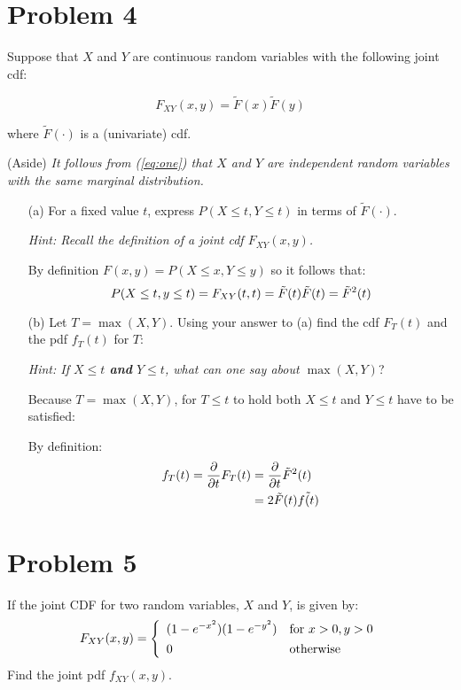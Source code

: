 \documentclass{article}
\newcommand{\1}{\mathbf{1}}
\begin{document}
\newpage
\section*{Problem 4} 
Suppose that $X$ and $Y$ are continuous random variables with the following joint cdf:

\begin{equation}\label{eq:one}
F_{XY}(x,y) = \widetilde{F}(x)\widetilde{F}(y)
\end{equation}

where $\widetilde{F}(\cdot)$ is a (univariate) cdf. 

{{(Aside)} \it It follows from {\rm (\ref{eq:one})} that $X$ and $Y$ are independent random variables with the same
marginal distribution.} 

\begin{itemize}
    \item[(a)] For a fixed value $t$, express $P(X \leq t, Y \leq t)$ in terms of $\widetilde{F}(\cdot)$.\par
    {\it Hint: Recall the definition of  a joint cdf $F_{XY}(x,y)$.}
    
    By definition $F(x,y)= P(X\leq x, Y\leq y)$ so it follows that:
    $$P(X \leq t, y\leq t) = F_{XY}(t,t) = \Tilde{F}(t)\Tilde{F}(t) = \Tilde{F}^2(t)$$
    
    \item[(b)] Let $T= \max (X,Y)$. Using your answer to (a) find the cdf $F_T(t)$ and the pdf $f_T(t)$ for $T$:\par
    {\it Hint: If $X\leq t$ {\bf and} $Y\leq t$, what can one say about $\max(X,Y)$}?
    
    Because $T= \max (X,Y)$, for $T\leq t$ to hold both $X\leq t$ and $Y\leq t$ have to be satisfied:
    
    By definition:
    \begin{align*}
        f_T(t) = \frac{\partial}{\partial t} F_T(t) &=  \frac{\partial}{\partial t} \Tilde{F}^2(t) \\
        &= 2\Tilde{F}(t)\Tilde{f(t)}
    \end{align*}

\end{itemize}




\newpage
\section*{Problem 5}  If the joint CDF for two random variables, $X$ and $Y$, is  
given by:
\[
F_{XY}(x,y) =\left\{\begin{array}{ll}
(1-e^{-x^2})(1-e^{-y^2}) & \hbox{for } x>0, y>0\\[4pt]
0 & \hbox{otherwise}
\end{array}
\right.
\]
Find the joint pdf $f_{XY}(x,y)$.
\end{document}
